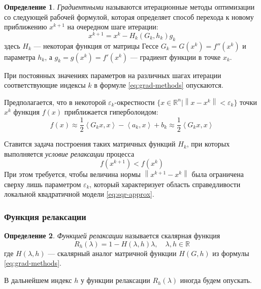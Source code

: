 \documentclass{article}
\renewcommand{\epsilon}{\varepsilon}
\newcommand{\neword}{\emph}
\newcommand{\norm}[1]{\left \lVert{#1}\right \rVert}
\newcommand{\set}[1]{\mathbb{#1}}
\newcommand{\scalmult}[1]{{\left \langle #1 \right \rangle}}
\theoremstyle{remark}
\theoremstyle{definition}
\newtheorem{dfn}{Определение}[section]
\numberwithin{equation}{section}
\begin{document}
\begin{dfn}
  \neword{Градиентными} называются итерационные методы оптимизации со
  следующей рабочей формулой, которая определяет способ перехода к
  новому приближению $x^{k+1}$ на очередном шаге итерации:
  \begin{equation}
    \label{eq:grad-methods}
    x^{k+1} = x^k - H_k\left(G_k, h_k\right) g_k
  \end{equation}
  здесь $H_k$ — некоторая функция от матрицы Гессе $G_k = G(x^k) =
  f''(x^k)$ и параметра $h_k$, а $g_k = g(x^k) = f'(x^k)$ — градиент
  функции в точке $x_k$.
\end{dfn}

При постоянных значениях параметров на различных шагах итерации
соответствующие индексы $k$ в формуле \eqref{eq:grad-methods}
опускаются.

Предполагается, что в некоторой $\epsilon_k$-окрестности $\{x \in
\set{R}^n | \norm{x-x^k} < \epsilon_k\}$ точки $x^k$ функция $f(x)$
приближается гиперболоидом:
\begin{equation}
  \label{eq:sqr-approx}
  f(x) \approx \frac{1}{2}\scalmult{G_k x, x} - \scalmult{a_k,x} + b_k \approx \frac{1}{2}\scalmult{G_k x, x}
\end{equation}

Ставится задача построения таких матричных функций $H_k$, при которых
выполняется \neword{условие релаксации} процесса
\begin{equation}
  \label{eq:relax-cond}
  f(x^{k+1}) < f(x^k)
\end{equation}
При этом требуется, чтобы величина нормы $\norm{x^{k+1}-x^{k}}$ была
ограничена сверху лишь параметром $\epsilon_k$, который характеризует
область справедливости локальной квадратичной модели
\eqref{eq:sqr-approx}.

\subsubsection{Функция релаксации}

\begin{dfn}
  \neword{Функцией релаксации} называется скалярная функция
  \begin{equation}
    \label{eq:relax-fun}
    R_h(\lambda) = 1 - H(\lambda, h)\lambda,\quad \lambda,h \in \set{R}
  \end{equation}
  где $H(\lambda, h)$ — скалярный аналог матричной функции $H(G, h)$
  из формулы \eqref{eq:grad-methods}.
\end{dfn}
В дальнейшем индекс $h$ у функции релаксации $R_h(\lambda)$ иногда
будем опускать.
\end{document}
